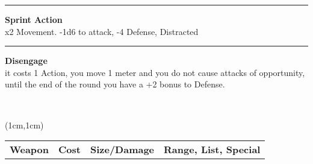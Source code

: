 \documentclass[a4paper,12 pt,openany]{book}
\newcommand{\linex}{\rule{\textwidth}{0.4pt}}
\begin{document}
\begin{textblock*}{6.2cm}
\linex

\textbf{Sprint Action}\\
x2 Movement. -1d6 to attack, -4 Defense, Distracted

\linex

\textbf{Disengage}\\
it costs 1 Action, you move 1 meter and you do not cause attacks of opportunity, until the end of the round you have a +2 bonus to Defense.

\end{textblock*}

~\newpage

\begin{textblock*}{19.5cm}(1cm,1cm) %

\begin{tabularx}{0.95\textwidth}{llll}
\textbf{Weapon}&\textbf{Cost}&\textbf{Size/Damage} & \textbf{Range, List, Special}\\


\end{tabularx}
\end{textblock*}
\end{document}

